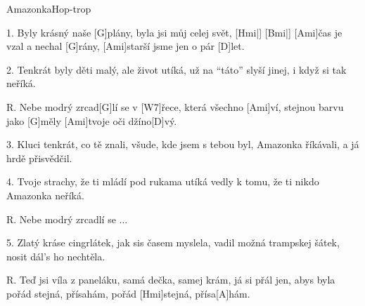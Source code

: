 \pagestyle{empty}

\fontsize{12.5pt}{16pt}
\selectfont

%
%
%
%
%


\begin{song}{Amazonka}{Hop-trop}

\begin{xverse}{1. }
Byly krásný naše [G]plány,
byla jsi můj celej svět, [Hmi|]{} [Bmi|]{}
[Ami]{}čas je vzal a nechal [G]rány,
[Ami]starší jsme jen o pár [D]let.
\end{xverse}

\begin{xverse}{2. }
Tenkrát byly děti malý, ale život utíká,
už na ``táto'' slyší jinej, i když si tak neříká.
\end{xverse}

\begin{xverse}{R. }
Nebe modrý zrcad[G]lí se
v [W7]{}řece, která všechno [Ami]ví,
stejnou barvu jako [G]měly
[Ami]tvoje oči džíno[D]vý.
\end{xverse}

\begin{xverse}{3. }
Kluci tenkrát, co tě znali,  všude, kde jsem s tebou byl,
Amazonka říkávali, a já hrdě přisvědčil.
\end{xverse}

\begin{xverse}{4. }
Tvoje strachy, že ti mládí pod rukama utíká
vedly k tomu, že ti nikdo Amazonka neříká.
\end{xverse}

\begin{xverse}{R. }
Nebe modrý zrcadlí se ...
\end{xverse}

\begin{xverse}{5. }
Zlatý kráse cingrlátek, jak sis časem myslela,
vadil možná trampskej šátek, nosit dál's ho nechtěla.
\end{xverse}

\begin{xverse}{R. }
Teď jsi víla z paneláku, samá dečka, samej krám,
já si přál jen, abys byla pořád stejná, přísahám,
pořád [Hmi]stejná, přísa[A]hám.
\end{xverse}

\end{song}

